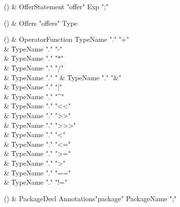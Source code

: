 \begin{bbgrammarappendix}

() & OfferStatement \label{prod:OfferStatement}  \: \xcd"offer" Exp \xcd";"  \\


\end{bbgrammarappendix}

\begin{bbgrammarappendix}

() & Offers \label{prod:Offers}  \: \xcd"offers" Type  \\


\end{bbgrammarappendix}

\begin{bbgrammarappendix}

() & OperatorFunction \label{prod:OperatorFunction}  \: TypeName \xcd"." \xcd"+"  \\

 &    \| TypeName \xcd"." \xcd"-" \\
 &    \| TypeName \xcd"." \xcd"*" \\
 &    \| TypeName \xcd"." \xcd"/" \\
 &    \| TypeName \xcd"." \xcd"%
 &    \| TypeName \xcd"." \xcd"&" \\
 &    \| TypeName \xcd"." \xcd"|" \\
 &    \| TypeName \xcd"." \xcd"^" \\
 &    \| TypeName \xcd"." \xcd"<<" \\
 &    \| TypeName \xcd"." \xcd">>" \\
 &    \| TypeName \xcd"." \xcd">>>" \\
 &    \| TypeName \xcd"." \xcd"<" \\
 &    \| TypeName \xcd"." \xcd"<=" \\
 &    \| TypeName \xcd"." \xcd">=" \\
 &    \| TypeName \xcd"." \xcd">" \\
 &    \| TypeName \xcd"." \xcd"==" \\
 &    \| TypeName \xcd"." \xcd"!=" \\

\end{bbgrammarappendix}

\begin{bbgrammarappendix}

() & PackageDecl \label{prod:PackageDecl}  \: Annotations\opt \xcd"package" PackageName \xcd";"  \\


\end{bbgrammarappendix}

